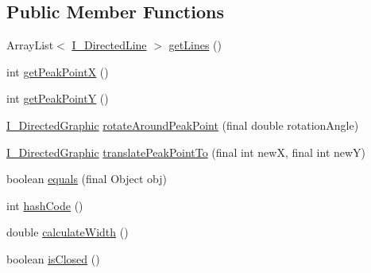 \subsection*{Public Member Functions}
\begin{DoxyCompactItemize}
\item 
Array\-List$<$ \hyperlink{interfaceorg_1_1tzi_1_1use_1_1gui_1_1views_1_1diagrams_1_1util_1_1_i___directed_line}{I\-\_\-\-Directed\-Line} $>$ \hyperlink{classorg_1_1tzi_1_1use_1_1gui_1_1views_1_1diagrams_1_1util_1_1_directed_graphic_adacc2e9611d575e30ed77be2d8b8b8e7}{get\-Lines} ()
\item 
int \hyperlink{classorg_1_1tzi_1_1use_1_1gui_1_1views_1_1diagrams_1_1util_1_1_directed_graphic_acb1d2f12099670d890172e5190f2d613}{get\-Peak\-Point\-X} ()
\item 
int \hyperlink{classorg_1_1tzi_1_1use_1_1gui_1_1views_1_1diagrams_1_1util_1_1_directed_graphic_aa637638170bf2c701e80bd00ba790b34}{get\-Peak\-Point\-Y} ()
\item 
\hyperlink{interfaceorg_1_1tzi_1_1use_1_1gui_1_1views_1_1diagrams_1_1util_1_1_i___directed_graphic}{I\-\_\-\-Directed\-Graphic} \hyperlink{classorg_1_1tzi_1_1use_1_1gui_1_1views_1_1diagrams_1_1util_1_1_directed_graphic_a65b6826bc278ed3c012bafaf29dd14ad}{rotate\-Around\-Peak\-Point} (final double rotation\-Angle)
\item 
\hyperlink{interfaceorg_1_1tzi_1_1use_1_1gui_1_1views_1_1diagrams_1_1util_1_1_i___directed_graphic}{I\-\_\-\-Directed\-Graphic} \hyperlink{classorg_1_1tzi_1_1use_1_1gui_1_1views_1_1diagrams_1_1util_1_1_directed_graphic_a068bcab7fe663ee23b7b2dfe03299c25}{translate\-Peak\-Point\-To} (final int new\-X, final int new\-Y)
\item 
boolean \hyperlink{classorg_1_1tzi_1_1use_1_1gui_1_1views_1_1diagrams_1_1util_1_1_directed_graphic_a57ce5b3e5173e12f863ad9e505e7dacc}{equals} (final Object obj)
\item 
int \hyperlink{classorg_1_1tzi_1_1use_1_1gui_1_1views_1_1diagrams_1_1util_1_1_directed_graphic_a4472e06e9546df3497fde61d2bb7f67b}{hash\-Code} ()
\item 
double \hyperlink{classorg_1_1tzi_1_1use_1_1gui_1_1views_1_1diagrams_1_1util_1_1_directed_graphic_a081310af7d57d4aa4b4de2b0214bf983}{calculate\-Width} ()
\item 
boolean \hyperlink{classorg_1_1tzi_1_1use_1_1gui_1_1views_1_1diagrams_1_1util_1_1_directed_graphic_a6a822e239a37d2da78c2bf6937f28b16}{is\-Closed} ()
\end{DoxyCompactItemize}
